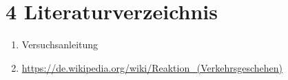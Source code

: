 \chapter*{4 Literaturverzeichnis}
\setcounter{chapter}{4}
\setcounter{section}{0}
\setcounter{subsection}{0}
\begin{enumerate}
    \item[\textbullet] Versuchsanleitung \label{ref:Versuchsanleitung}
    \item[\textbullet] \url{https://de.wikipedia.org/wiki/Reaktion_(Verkehrsgeschehen)} \label{ref:URL}
\end{enumerate}